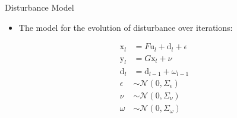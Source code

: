 \documentclass{beamer}
\newcommand{\liftedinput}{\mathrm{u}}
\newcommand{\liftedstate}{\mathrm{x}}
\newcommand{\liftedobs}{\mathrm{y}}
\newcommand{\disturbance}{\mathrm{d}}
\begin{document}
%
\begin{frame}{Disturbance Model}
\begin{itemize}
\item The model for the evolution of disturbance over iterations: \pause
\linebreak
\end{itemize}
\begin{equation}
\begin{aligned}
\liftedstate_l &= F\liftedinput_l + \disturbance_l + \epsilon \\
\liftedobs_l &= G\liftedstate_l + \nu \\
\disturbance_l &= \disturbance_{l-1} + \omega_{l-1} \\
\epsilon &\sim \mathcal{N}(0,\Sigma_{\epsilon}) \\
\nu &\sim \mathcal{N}(0,\Sigma_{\nu}) \\
\omega &\sim \mathcal{N}(0,\Sigma_{\omega}) \\
\end{aligned}
\end{equation}
\end{frame}
%
\end{document}
